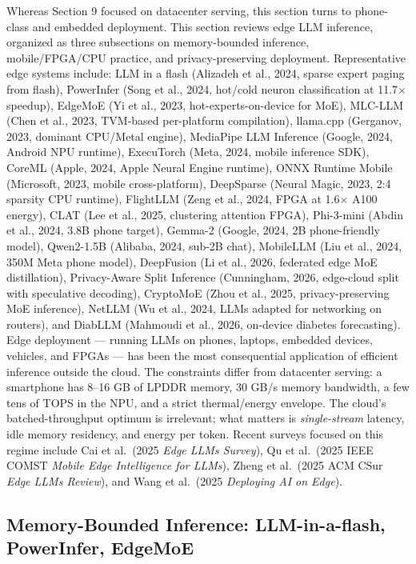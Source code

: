 Whereas Section 9 focused on datacenter serving, this section turns to phone-class and embedded deployment. This section reviews edge LLM inference, organized as three subsections on memory-bounded inference, mobile/FPGA/CPU practice, and privacy-preserving deployment. Representative edge systems include: LLM in a flash (Alizadeh et al., 2024, sparse expert paging from flash), PowerInfer (Song et al., 2024, hot/cold neuron classification at 11.7× speedup), EdgeMoE (Yi et al., 2023, hot-experts-on-device for MoE), MLC-LLM (Chen et al., 2023, TVM-based per-platform compilation), llama.cpp (Gerganov, 2023, dominant CPU/Metal engine), MediaPipe LLM Inference (Google, 2024, Android NPU runtime), ExecuTorch (Meta, 2024, mobile inference SDK), CoreML (Apple, 2024, Apple Neural Engine runtime), ONNX Runtime Mobile (Microsoft, 2023, mobile cross-platform), DeepSparse (Neural Magic, 2023, 2:4 sparsity CPU runtime), FlightLLM (Zeng et al., 2024, FPGA at 1.6× A100 energy), CLAT (Lee et al., 2025, clustering attention FPGA), Phi-3-mini (Abdin et al., 2024, 3.8B phone target), Gemma-2 (Google, 2024, 2B phone-friendly model), Qwen2-1.5B (Alibaba, 2024, sub-2B chat), MobileLLM (Liu et al., 2024, 350M Meta phone model), DeepFusion (Li et al., 2026, federated edge MoE distillation), Privacy-Aware Split Inference (Cunningham, 2026, edge-cloud split with speculative decoding), CryptoMoE (Zhou et al., 2025, privacy-preserving MoE inference), NetLLM (Wu et al., 2024, LLMs adapted for networking on routers), and DiabLLM (Mahmoudi et al., 2026, on-device diabetes forecasting). Edge deployment --- running LLMs on phones, laptops, embedded devices, vehicles, and FPGAs --- has been the most consequential application of efficient inference outside the cloud. The constraints differ from datacenter serving: a smartphone has 8--16 GB of LPDDR memory, 30 GB/s memory bandwidth, a few tens of TOPS in the NPU, and a strict thermal/energy envelope. The cloud's batched-throughput optimum is irrelevant; what matters is \emph{single-stream} latency, idle memory residency, and energy per token. Recent surveys focused on this regime include Cai et al.~(2025 \emph{Edge LLMs Survey}), Qu et al.~(2025 IEEE COMST \emph{Mobile Edge Intelligence for LLMs}), Zheng et al.~(2025 ACM CSur \emph{Edge LLMs Review}), and Wang et al.~(2025 \emph{Deploying AI on Edge}).

\subsection{Memory-Bounded Inference: LLM-in-a-flash, PowerInfer, EdgeMoE}\label{memory-bounded-inference-llm-in-a-flash-powerinfer-edgemoe}

